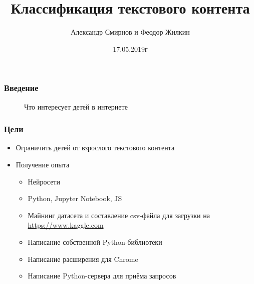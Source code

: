 \documentclass[xetex,mathserif,serif]{beamer}
\title{Классификация текстового контента}
\author{Александр Смирнов и Феодор Жилкин}
\date{17.05.2019г}
\begin{document}
	\frame{\titlepage}

	\begin{frame}
		\frametitle{Введение}
		\begin{figure}[h]
            \caption{Что интересует детей в интернете}
            \label{fig:image}
        \end{figure}
	\end{frame}
	
	\begin{frame}
		\frametitle{Цели}
			\begin{itemize}
		 		\item Ограничить детей от взрослого текстового контента
				\item Получение опыта
    				\begin{itemize}
    			    	\item Нейросети
    			    	\item Python, Jupyter Notebook, JS
    			    	\item Майнинг датасета и составление csv-файла для загрузки на \url{https://www.kaggle.com}
    			    	\item Написание собственной Python-библиотеки
    			    	\item Написание расширения для Chrome
    			    	\item Написание Python-сервера для приёма запросов
    		    	\end{itemize}
			\end{itemize}
	\end{frame}
	
\end{document}
